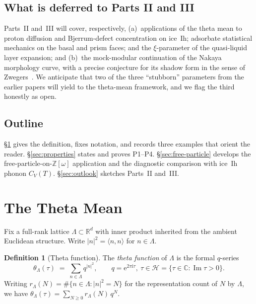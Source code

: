 \documentclass[11pt,letterpaper]{article}
\theoremstyle{plain}
\theoremstyle{definition}
\newtheorem{definition}[theorem]{Definition}
\newcommand{\Eisenstein}{\mathbb{Z}[\omega]}
\newcommand{\R}{\mathbb{R}}
\newcommand{\C}{\mathbb{C}}
\newcommand{\Lat}{\Lambda}
\newcommand{\e}{\mathrm{e}}
\DeclareMathOperator{\Imag}{Im}
\begin{document}
\subsection*{What is deferred to Parts II and III}
Parts~II and~III will cover, respectively, (a)~applications of the
theta mean to proton diffusion and Bjerrum-defect concentration on
ice~Ih; adsorbate statistical mechanics on the basal and prism
faces; and the $\xi$-parameter of the quasi-liquid layer
expansion; and (b)~the mock-modular continuation of the Nakaya
morphology curve, with a precise conjecture for its shadow form in
the sense of Zwegers~\cite{Zwegers2002}.  We anticipate that two of
the three ``stubborn'' parameters from the earlier papers will yield
to the theta-mean framework, and we flag the third honestly as open.

\subsection*{Outline}
\S\ref{sec:def} gives the definition, fixes notation, and records
three examples that orient the reader.
\S\ref{sec:properties} states and proves P1--P4.
\S\ref{sec:free-particle} develops the free-particle-on-$\Eisenstein$
application and the diagnostic comparison with ice~Ih phonon
$C_V(T)$.
\S\ref{sec:outlook} sketches Parts~II and~III.

\section{The Theta Mean}\label{sec:def}

Fix a full-rank lattice $\Lat \subset \R^d$ with inner product
inherited from the ambient Euclidean structure.  Write
$|n|^2 = \langle n,n\rangle$ for $n\in\Lat$.

\begin{definition}[Theta function]\label{def:theta}
The \emph{theta function} of $\Lat$ is the formal $q$-series
\begin{equation}\label{eq:theta-series}
  \theta_\Lat(\tau) \;=\; \sum_{n\in\Lat} q^{|n|^2},
  \qquad q = \e^{2\pi\mathrm{i}\tau},\ \tau\in\mathcal{H}
  = \{\tau\in\C : \Imag\tau>0\}.
\end{equation}
Writing $r_\Lat(N) = \#\{n\in\Lat : |n|^2=N\}$ for the
representation count of $N$ by $\Lat$, we have
$\theta_\Lat(\tau) = \sum_{N\ge 0} r_\Lat(N)\, q^N$.
\end{definition}
\end{document}
